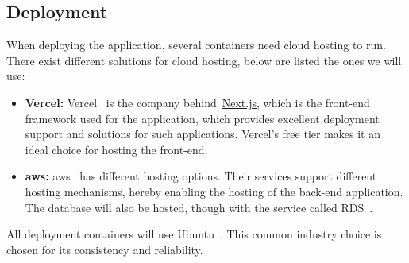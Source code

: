 \subsection{Deployment}\label{subsec:deployment}

When deploying the application, several containers need cloud hosting to run.
There exist different solutions for cloud hosting, below are listed the ones we will use:

\begin{itemize}
    \item \textbf{Vercel:}
    Vercel~\cite{vercel2024} is the company behind~\url{Next.js}, which is the front-end framework used for the
    application, which provides excellent deployment support and solutions for such applications.
    Vercel’s free tier makes it an ideal choice for hosting the front-end.

    \item \textbf{\acrfull{aws}:}
    \acrshort{aws}~\cite{aws2024} has different hosting options.
    Their services support different hosting mechanisms, hereby enabling the hosting of the back-end application.
    The database will also be hosted, though with the service called RDS~\cite{rds2024}.
\end{itemize}

All deployment containers will use Ubuntu~\cite{ubuntu2024}.
This common industry choice is chosen for its consistency and reliability.
